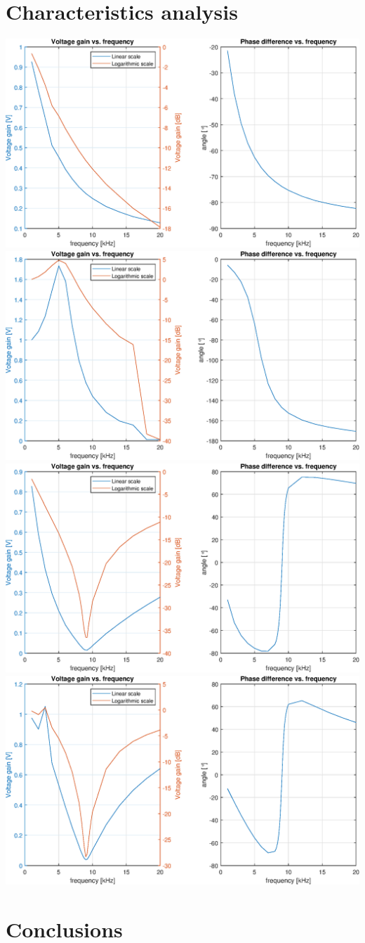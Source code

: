 \documentclass[notitlepage, a4paper, 11pt]{article}
\begin{document}
	\section{Characteristics analysis}
	\includegraphics[width=\textwidth]{../Matlab/img/11.eps}
	\includegraphics[width=\textwidth]{../Matlab/img/12.eps}
	\includegraphics[width=\textwidth]{../Matlab/img/131.eps}
	\includegraphics[width=\textwidth]{../Matlab/img/132.eps}
	\section{Conclusions}
\end{document}
